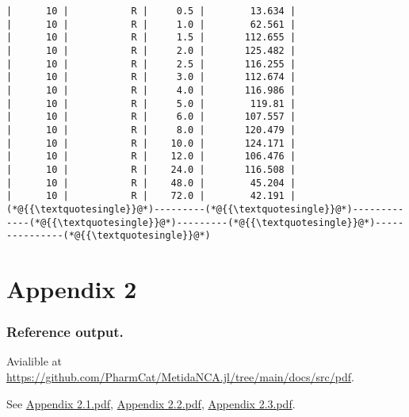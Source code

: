 \documentclass[12pt,a4paper]{article}
\begin{document}
\begin{lstlisting}
|      10 |           R |     0.5 |        13.634 |
|      10 |           R |     1.0 |        62.561 |
|      10 |           R |     1.5 |       112.655 |
|      10 |           R |     2.0 |       125.482 |
|      10 |           R |     2.5 |       116.255 |
|      10 |           R |     3.0 |       112.674 |
|      10 |           R |     4.0 |       116.986 |
|      10 |           R |     5.0 |        119.81 |
|      10 |           R |     6.0 |       107.557 |
|      10 |           R |     8.0 |       120.479 |
|      10 |           R |    10.0 |       124.171 |
|      10 |           R |    12.0 |       106.476 |
|      10 |           R |    24.0 |       116.508 |
|      10 |           R |    48.0 |        45.204 |
|      10 |           R |    72.0 |        42.191 |
(*@{{\textquotesingle}}@*)---------(*@{{\textquotesingle}}@*)-------------(*@{{\textquotesingle}}@*)---------(*@{{\textquotesingle}}@*)---------------(*@{{\textquotesingle}}@*)
\end{lstlisting}


\section{Appendix 2}
\subsubsection{Reference output.}
Avialible at \href{https://github.com/PharmCat/MetidaNCA.jl/tree/main/docs/src/pdf}{https://github.com/PharmCat/MetidaNCA.jl/tree/main/docs/src/pdf}.

See \href{https://github.com/PharmCat/MetidaNCA.jl/blob/main/docs/src/pdf/Appendix2.1.pdf}{Appendix 2.1.pdf}, \href{https://github.com/PharmCat/MetidaNCA.jl/blob/main/docs/src/pdf/Appendix2.2.pdf}{Appendix 2.2.pdf}, \href{https://github.com/PharmCat/MetidaNCA.jl/blob/main/docs/src/pdf/Appendix2.3.pdf}{Appendix 2.3.pdf}.
\end{document}
